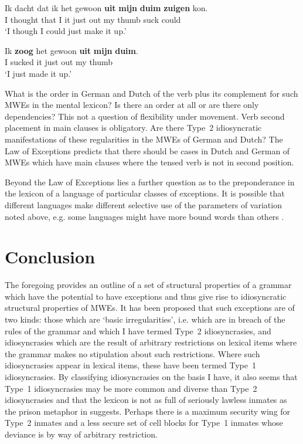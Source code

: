 \documentclass[output=paper]{langsci/langscibook}
\begin{document}
\ea\label{ex:ex53}
\gll Ik dacht  dat  ik het gewoon \textbf{uit}   \textbf{mijn} \textbf{duim}   \textbf{zuigen} kon.\\
  I  thought that I   it    just       out     my   thumb suck    could\\
\glt  ‘I though I could just make it up.’
\z

\ea\label{ex:ex54}
\gll Ik \textbf{zoog} het gewoon \textbf{uit}     \textbf{mijn}  \textbf{duim}.\\
  I  sucked  it    just       out      my   thumb\\
\glt  ‘I just made it up.’
\z

What is the order in German and Dutch of the verb plus its complement for such MWEs in the mental lexicon? Is there an order at all or are there only dependencies? This not a question of flexibility under movement. Verb second placement in main clauses is obligatory. Are there Type~2 idiosyncratic manifestations of these regularities in the MWEs of German and Dutch? The Law of Exceptions predicts that there should be cases in Dutch and German of MWEs which have main clauses where the tensed verb is not in second position.

Beyond the Law of Exceptions  lies a further question as to the preponderance in the lexicon of a language of particular classes of exceptions. 
It is possible that different languages make different selective use of the parameters of variation noted above, e.g. some languages might have 
more bound words than others \citep{Dobrovolskij1988}.

\section{Conclusion}

The foregoing provides an outline of a set of structural properties of a grammar which have the potential to have exceptions and thus give rise to idiosyncratic structural properties of MWEs. It has been proposed that such exceptions are of two kinds: those which are ‘basic irregularities’, i.e. which are in breach of the rules of the grammar and which %
I have termed Type~2 idiosyncrasies, and idiosyncrasies which are the result of arbitrary restrictions on lexical items where the grammar makes no stipulation about such restrictions. Where such idiosyncrasies appear in lexical items, these have been termed Type~1 idiosyncrasies. By classifying idiosyncrasies on the basis %
I have, it also seems that Type~1 idiosyncrasies may be more common and diverse than Type~2 idiosyncrasies and that the lexicon is not as full of seriously lawless inmates as the prison metaphor in \citet{DiSciullo1987} suggests. Perhaps there is a maximum security wing for Type~2 inmates and a less secure set of cell blocks for Type~1 inmates whose deviance is by way of arbitrary restriction. 
\end{document}
